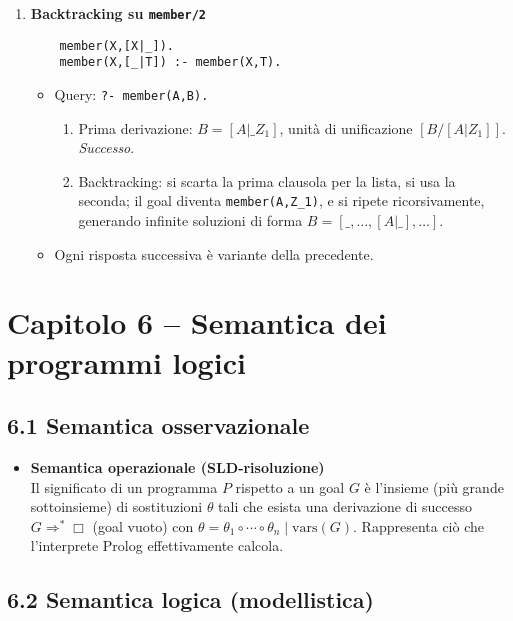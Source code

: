 \documentclass[12pt]{article}
\begin{document}
\begin{enumerate}
  \item \textbf{Backtracking su \texttt{member/2}}
    \begin{verbatim}
    member(X,[X|_]).
    member(X,[_|T]) :- member(X,T).
    \end{verbatim}
    \begin{itemize}
      \item Query: \texttt{?- member(A,B).}
      \begin{enumerate}
        \item Prima derivazione: $B = [A|\_Z_1]$, unità di unificazione $[B/[A|Z_1]]$. \emph{Successo}.
        \item Backtracking: si scarta la prima clausola per la lista, si usa la seconda; il goal diventa \texttt{member(A,Z\_1)}, e si ripete ricorsivamente, generando infinite soluzioni di forma $B=[\_,…,[A|\_],…]$.
      \end{enumerate}
      \item Ogni risposta successiva è variante della precedente.
    \end{itemize}
\end{enumerate}

\section*{Capitolo 6 – Semantica dei programmi logici}

\subsection*{6.1 Semantica osservazionale}

\begin{itemize}
  \item \textbf{Semantica operazionale (SLD‐risoluzione)}\\
    Il significato di un programma $P$ rispetto a un goal $G$ è l’insieme (più grande sottoinsieme) di sostituzioni $\theta$ tali che esista una derivazione di successo $G \Rightarrow^* \Box$ (goal vuoto) con $\theta = \theta_1\circ\cdots\circ\theta_n \mid \mathrm{vars}(G)$. Rappresenta ciò che l’interprete Prolog effettivamente calcola.
\end{itemize}

\subsection*{6.2 Semantica logica (modellistica)}
\end{document}

